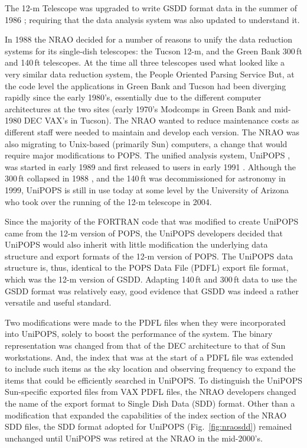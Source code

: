 \documentclass[final,authoryear,5p,times,twocolumn]{elsarticle}
\newcommand{\ascl}[1]{\href{http://www.ascl.net/#1}{ascl:#1}}
\begin{document}
The 12-m Telescope was upgraded to write GSDD format data in the
summer of 1986 \citep{tcus23,1987NRAO30}; requiring that the data
analysis system was also updated to understand it.

In 1988 the NRAO decided for a number of reasons to unify the data
reduction systems for its single-dish telescopes: the Tucson 12-m, and
the Green Bank 300\,ft and 140\,ft telescopes.  At the time all three
telescopes used what looked like a very similar data reduction system,
the People Oriented Parsing Service \citep[POPS;][]{1982POPS}
But, at the code level the applications in Green Bank
and Tucson had been diverging rapidly since the early 1980's,
essentially due to the different computer architectures at the two
sites (early 1970's Modcomps in Green Bank and mid-1980 DEC VAX's in
Tucson).  The NRAO wanted to reduce maintenance costs as different
staff were needed to maintain and develop each version.  The NRAO was
also migrating to Unix-based (primarily Sun) computers, a change that
would require major modifications to POPS. The unified analysis system, UniPOPS
\citep[][\ascl{1503.007}]{UNIPOPS}, was started in early 1989 and first released to users in early
1991 \citep{1991BAAS...23..535V}.  Although the 300\,ft collapsed in
1988 \citep{1990BAAS...22..487V}, and the 140\,ft was
decommissioned for astronomy in 1999, UniPOPS is still in use today at
some level by the University of Arizona who took over the running of
the 12-m telescope in 2004.

Since the majority of the FORTRAN code that was modified to create
UniPOPS came from the 12-m version of POPS, the UniPOPS developers
decided that UniPOPS would also inherit with little modification the
underlying data structure and export formats of the 12-m version of
POPS.  The UniPOPS data structure is, thus, identical to the POPS Data File
(PDFL) export file format, which was the 12-m version of GSDD.  Adapting 140\,ft
and 300\,ft data to use the GSDD format was
relatively easy, good evidence that GSDD was indeed a rather versatile
and useful standard.

Two modifications were made to the PDFL files when they were
incorporated into UniPOPS, solely to boost the performance of the
system.  The binary representation was changed from that of the DEC
architecture to that of Sun workstations.  And, the index that was at
the start of a PDFL file was extended to include such items as the sky
location and observing frequency to expand the items that could be
efficiently searched in UniPOPS.  To distinguish the UniPOPS
Sun-specific exported files from VAX PDFL files, the NRAO developers
changed the name of the export format to Single Dish Data (SDD) format.
Other than a modification that expanded the capabilities of the index
section of the NRAO SDD files, the SDD format adopted for UniPOPS
(Fig.~\ref{fig:nraosdd}) remained unchanged until UniPOPS was retired
at the NRAO in the mid-2000's.
\end{document}
